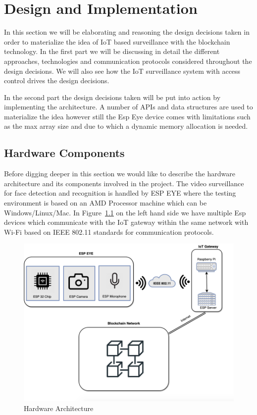 \chapter{Design and Implementation}
\label{chap:cran_for_lora}

In this section we will be elaborating and reasoning the design decisions taken in order to materialize the idea of IoT based surveillance with the blockchain technology. In the first part we will be discussing in detail the different approaches, technologies and communication protocols considered throughout the design decisions. We will also see how the IoT surveillance system with access control drives the design decisions. 

In the second part the design decisions taken will be put into action by implementing the architecture. A number of APIs and data structures are used to materialize the idea however still the Esp Eye device comes with limitations such as the max array size and due to which a dynamic memory allocation is needed.  





\section{Hardware Components}

Before digging deeper in this section we would like to describe the hardware architecture and its components involved in the project.
The video surveillance for face detection and recognition is handled by ESP EYE where the testing environment is based on an AMD Processor machine which can be Windows/Linux/Mac.
In Figure~\ref{fig:hardarchitecture} on the left hand side we have multiple Esp devices which communicate with the IoT gateway within the same network with Wi-Fi based on IEEE 802.11 standards for communication protocols. 

\begin{figure}[!htb]
    \centering
    \includegraphics[width=1\textwidth]{figures/surveillance1.png}
    \caption{Hardware Architecture}
    \label{fig:hardarchitecture}
\end{figure}


